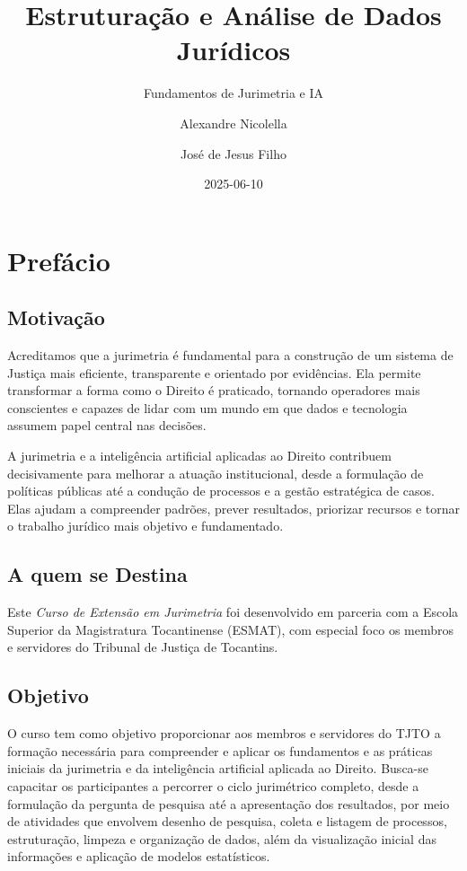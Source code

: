 \documentclass[
  letterpaper,
  DIV=11,
  numbers=noendperiod]{scrreprt}
\title{Estruturação e Análise de Dados Jurídicos}
\subtitle{Fundamentos de Jurimetria e IA}
\author{Alexandre Nicolella \and José de Jesus Filho}
\date{2025-06-10}
\renewcommand*\contentsname{Table of contents}
\newcommand\contentsname{Table of contents}
\begin{document}
\maketitle

\renewcommand*\contentsname{Table of contents}
{
\hypersetup{linkcolor=}
\setcounter{tocdepth}{2}
\tableofcontents
}


\chapter{Prefácio}\label{prefuxe1cio}

\section{\texorpdfstring{\textbf{Motivação}}{Motivação}}\label{motivauxe7uxe3o}

Acreditamos que a jurimetria é fundamental para a construção de um
sistema de Justiça mais eficiente, transparente e orientado por
evidências. Ela permite transformar a forma como o Direito é praticado,
tornando operadores mais conscientes e capazes de lidar com um mundo em
que dados e tecnologia assumem papel central nas decisões.

A jurimetria e a inteligência artificial aplicadas ao Direito contribuem
decisivamente para melhorar a atuação institucional, desde a formulação
de políticas públicas até a condução de processos e a gestão estratégica
de casos. Elas ajudam a compreender padrões, prever resultados,
priorizar recursos e tornar o trabalho jurídico mais objetivo e
fundamentado.

\section{\texorpdfstring{\textbf{A quem se
Destina}}{A quem se Destina}}\label{a-quem-se-destina}

Este \emph{Curso de Extensão em Jurimetria} foi desenvolvido em parceria
com a Escola Superior da Magistratura Tocantinense (ESMAT), com especial
foco os membros e servidores do Tribunal de Justiça de Tocantins.

\section{\texorpdfstring{\textbf{Objetivo}}{Objetivo}}\label{objetivo}

O curso tem como objetivo proporcionar aos membros e servidores do TJTO
a formação necessária para compreender e aplicar os fundamentos e as
práticas iniciais da jurimetria e da inteligência artificial aplicada ao
Direito. Busca-se capacitar os participantes a percorrer o ciclo
jurimétrico completo, desde a formulação da pergunta de pesquisa até a
apresentação dos resultados, por meio de atividades que envolvem desenho
de pesquisa, coleta e listagem de processos, estruturação, limpeza e
organização de dados, além da visualização inicial das informações e
aplicação de modelos estatísticos.
\end{document}
